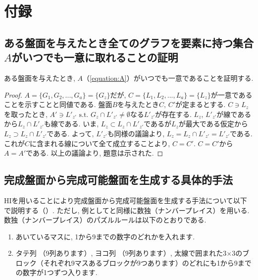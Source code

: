 \chapter{付録}
\section{ある盤面を与えたとき全てのグラフを要素に持つ集合$A$がいつでも一意に取れることの証明}\label{section:GraphUnique}
ある盤面を与えたとき, $A$（\cref{equation:A}）がいつでも一意であることを証明する.
\begin{proof}
  $A=\{G_1,G_2,...,G_a\}=\{G_z\}$だが, $C=\{L_1,L_2,...,L_a\}=\{L_z\}$が一意であることを示すことと同値である. 盤面$B$を与えたとき$C$, $C'$が定まるとする. $C\ni  L_z$を取ったとき, $A'\ni  L'_{z'} \mbox{ s.t. $G_z \cap L'_{z'} \neq \emptyset $}$なる$L'_{z'}$が存在する. $L_z$, $L'_{z'}$が線であるから$L_z\cap L'_{z'}$も線である. いま, $L_z\subset L_z\cap L'_{z'}$であるが$L_z$が最大である仮定から$L_z\supset L_z\cap L'_{z'}$である. よって, $L'_{z'}$も同様の議論より, $L_z= L_z\cap L'_{z'}=L'_{z'}$である. これが$C$に含まれる線について全て成立することより, $C=C'$. $C=C'$から$A=A'$である. 以上の議論より, 題意は示された.
\end{proof}

\section{完成盤面から完成可能盤面を生成する具体的手法}\label{section:GenericAlgorithm}
HIを用いることにより完成盤面から完成可能盤面を生成する手法について以下で説明する（\cite{Fujiwara2022}）. ただし, 例として\cite{Fujiwara2022}と同様に数独（ナンバープレイス）を用いる. 数独（ナンバープレイス）のパズルルールは以下のとおりである. \cite{web:Sudoku}

\begin{enumerate}
  \item あいているマスに, 1から9までの数字のどれかを入れます.
  \item タテ列 （9列あります）, ヨコ列 （9列あります）, 太線で囲まれた3$\times$3のブロック（それぞれ9マスあるブロックが9つあります）のどれにも1から9までの数字が1つずつ入ります.
\end{enumerate}

